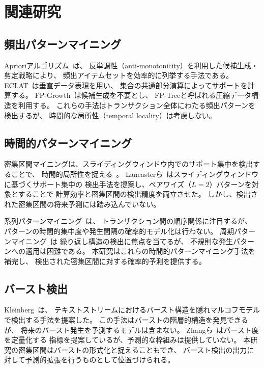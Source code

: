 \section{関連研究}\label{sec:related}

\subsection{頻出パターンマイニング}

Aprioriアルゴリズム~\cite{agrawal1994fast}は、
反単調性（anti-monotonicity）を利用した候補生成・剪定戦略により、
頻出アイテムセットを効率的に列挙する手法である。
ECLAT~\cite{zaki2000scalable}は垂直データ表現を用い、
集合の共通部分演算によってサポートを計算する。
FP-Growth~\cite{han2000mining}は候補生成を不要とし、
FP-Treeと呼ばれる圧縮データ構造を利用する。
これらの手法はトランザクション全体にわたる頻出パターンを検出するが、
時間的な局所性（temporal locality）は考慮しない。

\subsection{時間的パターンマイニング}

密集区間マイニングは、スライディングウィンドウ内でのサポート集中を検出することで、
時間的局所性を捉える~\cite{lancaster2018surges}。
Lancasterら~\cite{lancaster2018surges}はスライディングウィンドウに基づくサポート集中の
検出手法を提案し、ペアワイズ（$L=2$）パターンを対象とすることで
計算効率と密集区間の検出精度を両立させた。
しかし、検出された密集区間の将来予測には踏み込んでいない。

系列パターンマイニング~\cite{pei2004mining}は、
トランザクション間の順序関係に注目するが、
パターンの時間的集中度や発生間隔の確率的モデル化は行わない。
周期パターンマイニング~\cite{han1999efficient}は
繰り返し構造の検出に焦点を当てるが、
不規則な発生パターンへの適用は困難である。
本研究はこれらの時間的パターンマイニング手法を補完し、
検出された密集区間に対する確率的予測を提供する。

\subsection{バースト検出}

Kleinberg~\cite{kleinberg2003bursty}は、
テキストストリームにおけるバースト構造を隠れマルコフモデルで検出する手法を提案した。
この手法はバーストの階層的構造を発見できるが、
将来のバースト発生を予測するモデルは含まない。
Zhangら~\cite{zhang2014burstiness}はバースト度を定量化する
指標を提案しているが、予測的な枠組みは提供していない。
本研究の密集区間はバーストの形式化と捉えることもでき、
バースト検出の出力に対して予測的拡張を行うものとして位置づけられる。

